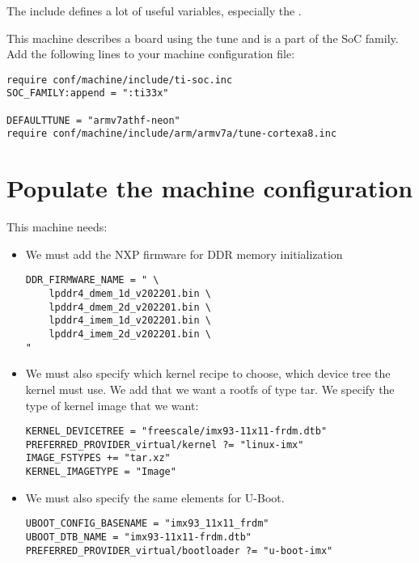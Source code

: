 The  include defines a lot of useful variables, especially
the .
\fi

\if{}
This machine describes a board using the  tune
and is a part of the  SoC family. Add the following lines
to your machine configuration file:

\begin{verbatim}
require conf/machine/include/ti-soc.inc
SOC_FAMILY:append = ":ti33x"

DEFAULTTUNE = "armv7athf-neon"
require conf/machine/include/arm/armv7a/tune-cortexa8.inc
\end{verbatim}
\fi

\section{Populate the machine configuration}

This  machine needs:

\if{}
\begin{itemize}
  \item We must add the NXP firmware for DDR memory initialization
\begin{verbatim}
DDR_FIRMWARE_NAME = " \
    lpddr4_dmem_1d_v202201.bin \
    lpddr4_dmem_2d_v202201.bin \
    lpddr4_imem_1d_v202201.bin \
    lpddr4_imem_2d_v202201.bin \
"
\end{verbatim}

  \item We must also specify which kernel recipe to choose, which device tree the kernel must use. We add that we want a rootfs of type tar. We specify the type of kernel image that we want:
\begin{verbatim}
KERNEL_DEVICETREE = "freescale/imx93-11x11-frdm.dtb"
PREFERRED_PROVIDER_virtual/kernel ?= "linux-imx"
IMAGE_FSTYPES += "tar.xz"
KERNEL_IMAGETYPE = "Image"

\end{verbatim}

  \item We must also specify the same elements for U-Boot.
\begin{verbatim}
UBOOT_CONFIG_BASENAME = "imx93_11x11_frdm"
UBOOT_DTB_NAME = "imx93-11x11-frdm.dtb"
PREFERRED_PROVIDER_virtual/bootloader ?= "u-boot-imx"
\end{verbatim}
\end{itemize}
\fi


